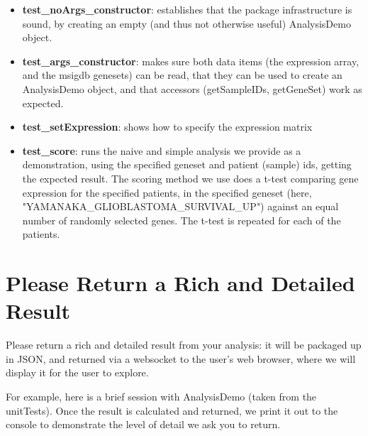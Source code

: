 \documentclass{article}
\begin{document}
\begin{itemize}
    \item \textbf{test\_noArgs\_constructor}:  establishes that the package infrastructure is sound, by creating an empty (and thus not otherwise useful) AnalysisDemo object.
    \item \textbf{test\_args\_constructor}:  makes sure both data items (the expression array, and the msigdb genesets) can be read, that they can be used to create an
AnalysisDemo object, and that accessors (getSampleIDs, getGeneSet) work as expected.
    \item \textbf{test\_setExpression}: shows how to specify the expression matrix 
    \item \textbf{test\_score}:  runs the naive and simple analysis we provide as a demonstration, using the specified geneset and patient (sample) ids, getting the 
expected result.   The scoring method we use does a t-test comparing gene expression for the specified patients, in the specified geneset (here, "YAMANAKA\_GLIOBLASTOMA\_SURVIVAL\_UP")
against an equal number of randomly selected genes.  The t-test is repeated for each of the patients. 

\end{itemize}

\section{Please Return a Rich and Detailed Result}

Please return a rich and detailed result from your analysis:  it will be packaged up in JSON, and returned via a websocket to the 
user's web browser, where we will display it for the user to explore.   

For example, here is a brief session with AnalysisDemo (taken from the unitTests).  Once the result is calculated and returned,
we print it out to the console to demonstrate the level of detail we ask you to return.
\end{document}

